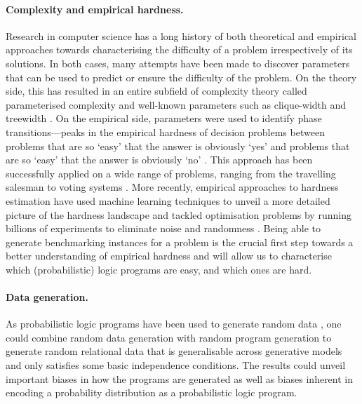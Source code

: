 \documentclass{article}
\begin{document}
\paragraph{Complexity and empirical hardness.} Research in computer science has
a long history of both theoretical and empirical approaches towards
characterising the difficulty of a problem irrespectively of its solutions. In
both cases, many attempts have been made to discover parameters that can be used
to predict or ensure the difficulty of the problem. On the theory side, this has
resulted in an entire subfield of complexity theory called parameterised
complexity \cite{DBLP:series/mcs/DowneyF99} and well-known parameters such as
clique-width \cite{DBLP:journals/jcss/CourcelleER93,DBLP:journals/dam/Wanke94}
and treewidth \cite{diestel2005graph}. On the empirical side, parameters were
used to identify phase transitions---peaks in the empirical hardness of decision
problems between problems that are so `easy' that the answer is obviously `yes'
and problems that are so `easy' that the answer is obviously `no'
\cite{DBLP:conf/ijcai/CheesemanKT91}. This approach has been successfully
applied on a wide range of problems, ranging from the travelling salesman
\cite{DBLP:journals/ai/GentW96} to voting systems
\cite{DBLP:conf/ijcai/Walsh09}. More recently, empirical approaches to hardness
estimation have used machine learning techniques to unveil a more detailed
picture of the hardness landscape \cite{DBLP:journals/cacm/Leyton-BrownHHX14}
and tackled optimisation problems by running billions of experiments to
eliminate noise and randomness \cite{DBLP:conf/cp/McCreeshPP19}. Being able to
generate benchmarking instances for a problem is the crucial first step towards
a better understanding of empirical hardness and will allow us to characterise
which (probabilistic) logic programs are easy, and which ones are hard.

\paragraph{Data generation.} As probabilistic logic programs have been used to
generate random data \cite{DBLP:conf/soict/Dries15}, one could combine random
data generation with random program generation to generate random relational
data that is generalisable across generative models and only satisfies some
basic independence conditions. The results could unveil important biases in how
the programs are generated as well as biases inherent in encoding a probability
distribution as a probabilistic logic program.
\end{document}
